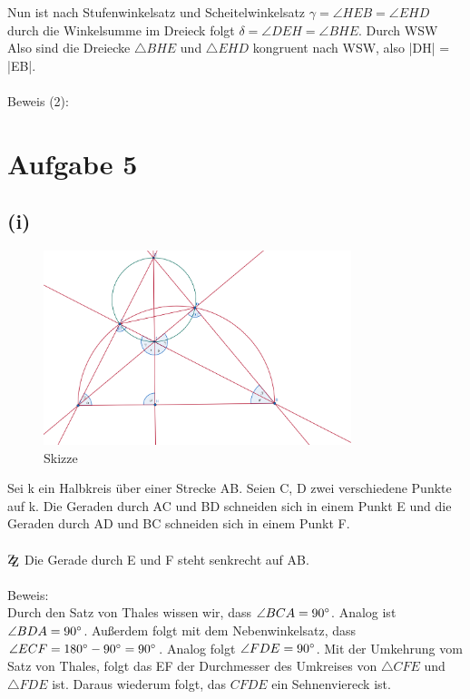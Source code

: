 \documentclass[12pt,a4paper]{article}
\begin{document}
\noindent Nun ist nach Stufenwinkelsatz und Scheitelwinkelsatz $\gamma = \angle HEB = \angle EHD$ durch die Winkelsumme im Dreieck folgt $\delta = \angle DEH = \angle BHE$. Durch WSW Also sind die Dreiecke $\triangle BHE$ und $\triangle EHD$ kongruent nach WSW, also |DH| = |EB|.\\
\\
Beweis (2): \\
\newpage
\section*{Aufgabe 5}
\subsection*{(i)}
\begin{figure}[htbp]             
    \centering             
    \includegraphics[width=0.8\textwidth]{Blatt_02_Aufgabe_2_i.png}
    \caption{Skizze}     
    \label{fig:mein_bild}
\end{figure}
\noindent Sei k ein Halbkreis über einer Strecke AB. Seien C, D zwei verschiedene Punkte auf k. Die Geraden durch AC und BD schneiden sich in einem Punkt E und die Geraden durch AD und BC schneiden sich in einem Punkt F.\\
\\
\noindent $\mathrm{Z\kern-.3em\raise-0.5ex\hbox{Z}}$ 
Die Gerade durch E und F steht senkrecht auf AB.\\
\\
Beweis: \\
Durch den Satz von Thales wissen wir, dass $\angle BCA = 90\degree$. Analog ist $\angle BDA = 90\degree$. Außerdem folgt mit dem Nebenwinkelsatz, dass $\angle ECF = 180\degree - 90\degree = 90\degree$. Analog folgt $\angle FDE = 90\degree$. Mit der Umkehrung vom Satz von Thales, folgt das EF der Durchmesser des Umkreises von $\triangle CFE$ und $\triangle FDE$ ist. Daraus wiederum folgt, das $CFDE$ ein Sehnenviereck ist. 
\newpage
\end{document}
